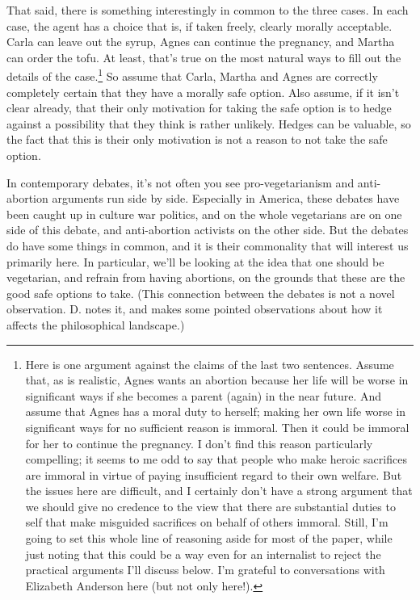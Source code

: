 That said, there is something interestingly in common to the three cases. In each case, the agent has a choice that is, if taken freely, clearly morally acceptable. Carla can leave out the syrup, Agnes can continue the pregnancy, and Martha can order the tofu. At least, that's true on the most natural ways to fill out the details of the case.\footnote{Here is one argument against the claims of the last two sentences. Assume that, as is realistic, Agnes wants an abortion because her life will be worse in significant ways if she becomes a parent (again) in the near future. And assume that Agnes has a moral duty to herself; making her own life worse in significant ways for no sufficient reason is immoral. Then it could be immoral for her to continue the pregnancy. I don't find this reason particularly compelling; it seems to me odd to say that people who make heroic sacrifices are immoral in virtue of paying insufficient regard to their own welfare. But the issues here are difficult, and I certainly don't have a strong argument that we should give no credence to the view that there are substantial duties to self that make misguided sacrifices on behalf of others immoral. Still, I'm going to set this whole line of reasoning aside for most of the paper, while just noting that this could be a way even for an internalist to reject the practical arguments I'll discuss below. I'm grateful to conversations with Elizabeth Anderson here (but not only here!).} So assume that Carla, Martha and Agnes are correctly completely certain that they have a morally safe option. Also assume, if it isn't clear already, that their only motivation for taking the safe option is to hedge against a possibility that they think is rather unlikely. Hedges can be valuable, so the fact that this is their only motivation is not a reason to not take the safe option.

In contemporary debates, it's not often you see pro-vegetarianism and anti-abortion arguments run side by side. Especially in America, these debates have been caught up in culture war politics, and on the whole vegetarians are on one side of this debate, and anti-abortion activists on the other side. But the debates do have some things in common, and it is their commonality that will interest us primarily here. In particular, we'll be looking at the idea that one should be vegetarian, and refrain from having abortions, on the grounds that these are the good safe options to take. (This connection between the debates is not a novel observation. D.  \citet[426]{Moller2011} notes it, and makes some pointed observations about how it affects the philosophical landscape.)

